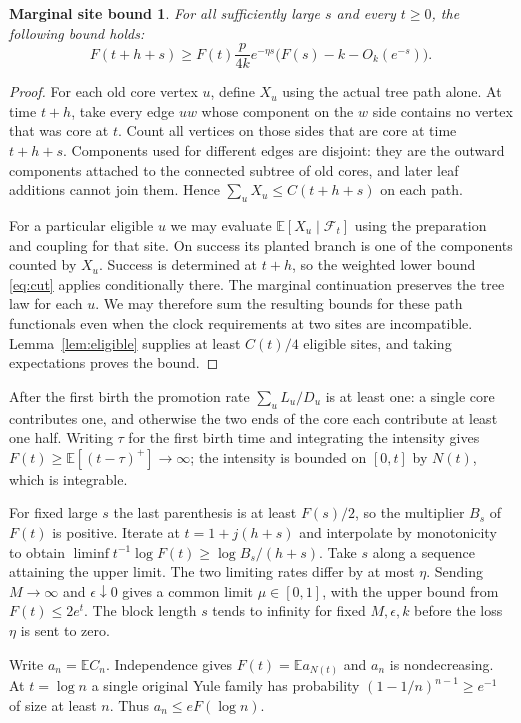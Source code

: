 \documentclass[11pt]{article}
\newtheorem*{marginalfact}{Marginal site bound}
\theoremstyle{remark}
\numberwithin{equation}{section}
\newcommand{\E}{\mathbb E}
\begin{document}
\begin{marginalfact}
For all sufficiently large $s$ and every $t\ge0$, the following bound holds:
\[
F(t+h+s)\ge F(t)\frac{p}{4k}e^{-\eta s}
                    \big(F(s)-k-O_k(e^{-s})\big).
\]
\end{marginalfact}
\begin{proof}
For each old core vertex $u$, define $X_u$ using the actual tree path alone. At time $t+h$, take every edge $uw$ whose component on the $w$ side contains no vertex that was core at $t$. Count all vertices on those sides that are core at time $t+h+s$. Components used for different edges are disjoint: they are the outward components attached to the connected subtree of old cores, and later leaf additions cannot join them. Hence $\sum_u X_u\le C(t+h+s)$ on each path.

For a particular eligible $u$ we may evaluate $\E[X_u\mid\mathcal F_t]$ using the preparation and coupling for that site. On success its planted branch is one of the components counted by $X_u$. Success is determined at $t+h$, so the weighted lower bound \eqref{eq:cut} applies conditionally there. The marginal continuation preserves the tree law for each $u$. We may therefore sum the resulting bounds for these path functionals even when the clock requirements at two sites are incompatible. Lemma~\ref{lem:eligible} supplies at least $C(t)/4$ eligible sites, and taking expectations proves the bound.
\end{proof}

After the first birth the promotion rate $\sum_u L_u/D_u$ is at least one: a single core contributes one, and otherwise the two ends of the core each contribute at least one half. Writing $\tau$ for the first birth time and integrating the intensity gives $F(t)\ge\E[(t-\tau)^+]\to\infty$; the intensity is bounded on $[0,t]$ by $N(t)$, which is integrable.

For fixed large $s$ the last parenthesis is at least $F(s)/2$, so the multiplier $B_s$ of $F(t)$ is positive. Iterate at $t=1+j(h+s)$ and interpolate by monotonicity to obtain $\liminf t^{-1}\log F(t)\ge\log B_s/(h+s)$. Take $s$ along a sequence attaining the upper limit. The two limiting rates differ by at most $\eta$. Sending $M\to\infty$ and $\epsilon\downarrow0$ gives a common limit $\mu\in[0,1]$, with the upper bound from $F(t)\le2e^t$. The block length $s$ tends to infinity for fixed $M,\epsilon,k$ before the loss $\eta$ is sent to zero.

Write $a_n=\E C_n$. Independence gives $F(t)=\E a_{N(t)}$ and $a_n$ is nondecreasing. At $t=\log n$ a single original Yule family has probability $(1-1/n)^{n-1}\ge e^{-1}$ of size at least $n$. Thus $a_n\le eF(\log n)$.
\end{document}
